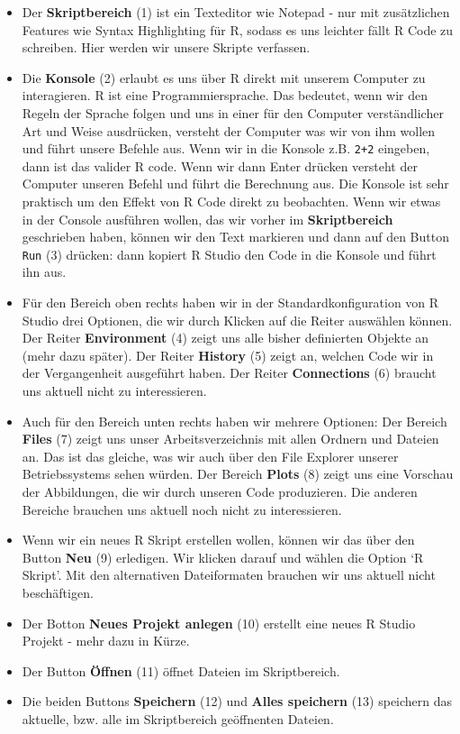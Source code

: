 \documentclass[]{book}
\begin{document}
\begin{itemize}
\item
  Der \textbf{Skriptbereich} (1) ist ein Texteditor wie Notepad - nur
  mit zusätzlichen Features wie Syntax Highlighting für R, sodass es uns
  leichter fällt R Code zu schreiben. Hier werden wir unsere Skripte
  verfassen.
\item
  Die \textbf{Konsole} (2) erlaubt es uns über R direkt mit unserem
  Computer zu interagieren. R ist eine Programmiersprache. Das bedeutet,
  wenn wir den Regeln der Sprache folgen und uns in einer für den
  Computer verständlicher Art und Weise ausdrücken, versteht der
  Computer was wir von ihm wollen und führt unsere Befehle aus. Wenn wir
  in die Konsole z.B. \texttt{2+2} eingeben, dann ist das valider R
  code. Wenn wir dann Enter drücken versteht der Computer unseren Befehl
  und führt die Berechnung aus. Die Konsole ist sehr praktisch um den
  Effekt von R Code direkt zu beobachten. Wenn wir etwas in der Console
  ausführen wollen, das wir vorher im \textbf{Skriptbereich} geschrieben
  haben, können wir den Text markieren und dann auf den Button
  \texttt{Run} (3) drücken: dann kopiert R Studio den Code in die
  Konsole und führt ihn aus.
\item
  Für den Bereich oben rechts haben wir in der Standardkonfiguration von
  R Studio drei Optionen, die wir durch Klicken auf die Reiter auswählen
  können. Der Reiter \textbf{Environment} (4) zeigt uns alle bisher
  definierten Objekte an (mehr dazu später). Der Reiter \textbf{History}
  (5) zeigt an, welchen Code wir in der Vergangenheit ausgeführt haben.
  Der Reiter \textbf{Connections} (6) braucht uns aktuell nicht zu
  interessieren.
\item
  Auch für den Bereich unten rechts haben wir mehrere Optionen: Der
  Bereich \textbf{Files} (7) zeigt uns unser Arbeitsverzeichnis mit
  allen Ordnern und Dateien an. Das ist das gleiche, was wir auch über
  den File Explorer unserer Betriebssystems sehen würden. Der Bereich
  \textbf{Plots} (8) zeigt uns eine Vorschau der Abbildungen, die wir
  durch unseren Code produzieren. Die anderen Bereiche brauchen uns
  aktuell noch nicht zu interessieren.
\item
  Wenn wir ein neues R Skript erstellen wollen, können wir das über den
  Button \textbf{Neu} (9) erledigen. Wir klicken darauf und wählen die
  Option `R Skript'. Mit den alternativen Dateiformaten brauchen wir uns
  aktuell nicht beschäftigen.
\item
  Der Botton \textbf{Neues Projekt anlegen} (10) erstellt eine neues R
  Studio Projekt - mehr dazu in Kürze.
\item
  Der Button \textbf{Öffnen} (11) öffnet Dateien im Skriptbereich.
\item
  Die beiden Buttons \textbf{Speichern} (12) und \textbf{Alles
  speichern} (13) speichern das aktuelle, bzw. alle im Skriptbereich
  geöffnenten Dateien.
\end{itemize}
\end{document}
